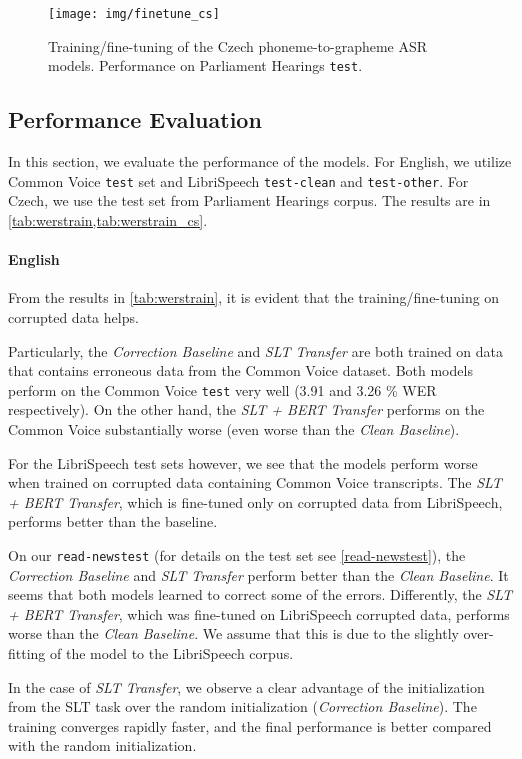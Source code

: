 \begin{figure}[h]
	\texttt{[image: img/finetune\_cs]}
	\caption{Training/fine-tuning of the Czech phoneme-to-grapheme ASR models. Performance on Parliament Hearings \texttt{test}.}
	\label{fig:finetune_cs}
\end{figure}

\subsection{Performance Evaluation}
In this section, we evaluate the performance of the models. For English, we utilize Common Voice \texttt{test} set and LibriSpeech \texttt{test-clean} and \texttt{test-other}. For Czech, we use the test set from Parliament Hearings corpus. The results are in \cref{tab:werstrain,tab:werstrain_cs}.

\paragraph{English} 
From the results in \cref{tab:werstrain}, it is evident that the training/fine-tuning on corrupted data helps. 

Particularly, the \emph{Correction Baseline} and \emph{SLT Transfer} are both trained on data that contains erroneous data from the Common Voice dataset. Both models perform on the Common Voice \texttt{test} very well (3.91 and 3.26 \% WER respectively). On the other hand, the \emph{SLT + BERT Transfer} performs on the Common Voice substantially worse (even worse than the \emph{Clean Baseline}). 

For the LibriSpeech test sets however, we see that the models perform worse when trained on corrupted data containing Common Voice transcripts. The \emph{SLT + BERT Transfer}, which is fine-tuned only on corrupted data from LibriSpeech, performs better than the baseline.

On our \texttt{read-newstest} (for details on the test set see \cref{read-newstest}), the \emph{Correction Baseline} and \emph{SLT Transfer} perform better than the \emph{Clean Baseline}. It seems that both models learned to correct some of the errors. Differently, the \emph{SLT + BERT Transfer}, which was fine-tuned on LibriSpeech corrupted data, performs worse than the \emph{Clean Baseline}. We assume that this is due to the slightly over-fitting of the model to the LibriSpeech corpus.

In the case of \emph{SLT Transfer}, we observe a clear advantage of the initialization from the SLT task over the random initialization (\emph{Correction Baseline}). The training converges rapidly faster, and the final performance is better compared with the random initialization.


